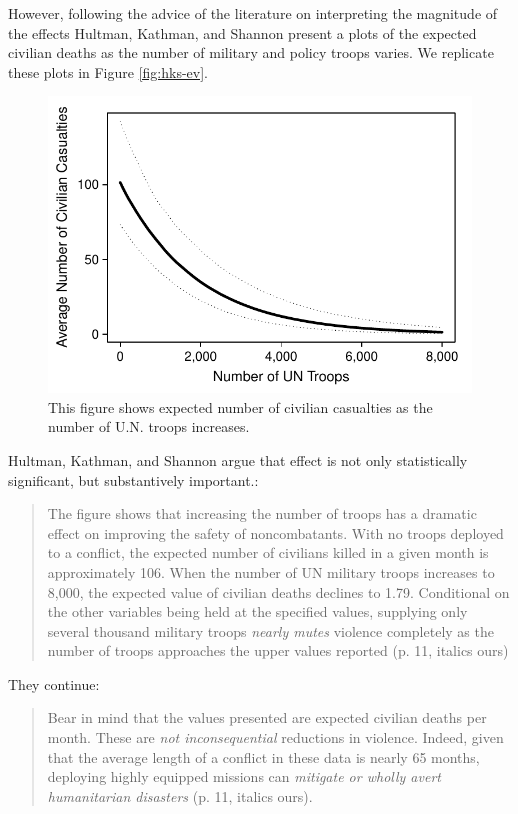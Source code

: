 \documentclass[12pt]{article}
\begin{document}
However, following the advice of the literature on interpreting the magnitude of the effects Hultman, Kathman, and Shannon present a plots of the expected civilian deaths as the number of military and policy troops varies. We replicate these plots in Figure \ref{fig:hks-ev}.

\begin{figure}[H]
\begin{center}
\includegraphics[scale = .8]{figs/hks-ev.pdf}
\caption{This figure shows expected number of civilian casualties as the number of U.N. troops increases.}\label{fig:hks-ci}
\end{center}
\end{figure}

Hultman, Kathman, and Shannon argue that effect is not only statistically significant, but substantively important.:

\begin{quote}
The figure shows that increasing the number of troops has a dramatic effect on improving the safety of noncombatants. With no troops deployed to a conflict, the expected number of civilians killed in a given month is approximately 106. When the number of UN military troops increases to 8,000, the expected value of civilian deaths declines to 1.79. Conditional on the other variables being held at the specified values, supplying only several thousand military troops \emph{nearly mutes} violence completely as the number of troops approaches the upper values reported (p. 11, italics ours)
\end{quote}

They continue:

\begin{quote}
Bear in mind that the values presented are expected civilian deaths per month. These are \emph{not inconsequential} reductions in violence. Indeed, given that the average length of a conflict in these data is nearly 65 months, deploying highly equipped missions can \emph{mitigate or wholly avert humanitarian disasters} (p. 11, italics ours).
\end{quote}
\end{document}
